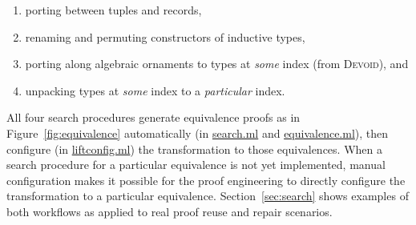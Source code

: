 \begin{enumerate}
\item porting between tuples and records,
\item renaming and permuting constructors of inductive types,
\item porting along algebraic ornaments to types at \textit{some} index (from \textsc{Devoid}), and
\item unpacking types at \textit{some} index to a \textit{particular} index.
\end{enumerate}
All four search procedures generate equivalence proofs as in Figure~\ref{fig:equivalence} automatically (in \href{https://github.com/uwplse/ornamental-search/blob/master/plugin/src/automation/search/search.ml}{search.ml} and \href{https://github.com/uwplse/ornamental-search/blob/master/plugin/src/automation/search/equivalence.ml}{equivalence.ml}),
then configure (in \href{https://github.com/uwplse/ornamental-search/blob/master/plugin/src/automation/lift/liftconfig.ml}{liftconfig.ml}) the transformation to those equivalences.
When a search procedure for a particular equivalence is not yet implemented, manual configuration makes it possible
for the proof engineering to directly configure the transformation to a particular equivalence.
Section~\ref{sec:search} shows examples of both workflows as applied to real proof reuse and repair scenarios.





